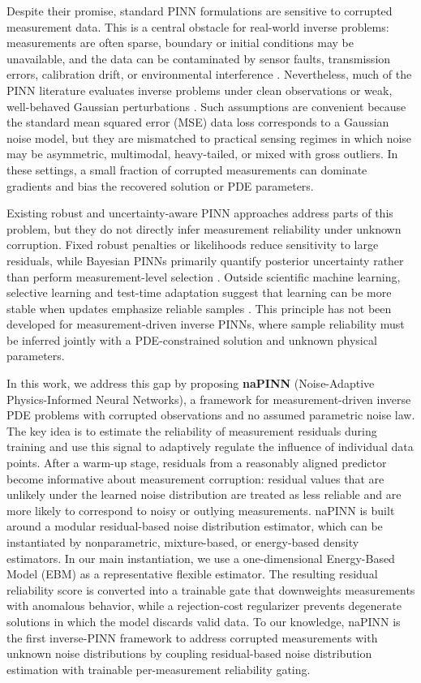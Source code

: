 \documentclass{article}
\theoremstyle{plain}
\theoremstyle{definition}
\theoremstyle{remark}
\begin{document}
Despite their promise, standard PINN formulations are sensitive to corrupted measurement data. This is a central obstacle for real-world inverse problems: measurements are often sparse, boundary or initial conditions may be unavailable, and the data can be contaminated by sensor faults, transmission errors, calibration drift, or environmental interference \cite{Chander2022}. Nevertheless, much of the PINN literature evaluates inverse problems under clean observations or weak, well-behaved Gaussian perturbations \cite{Pilar2024}. Such assumptions are convenient because the standard mean squared error (MSE) data loss corresponds to a Gaussian noise model, but they are mismatched to practical sensing regimes in which noise may be asymmetric, multimodal, heavy-tailed, or mixed with gross outliers. In these settings, a small fraction of corrupted measurements can dominate gradients and bias the recovered solution or PDE parameters.

Existing robust and uncertainty-aware PINN approaches address parts of this problem, but they do not directly infer measurement reliability under unknown corruption. Fixed robust penalties or likelihoods reduce sensitivity to large residuals, while Bayesian PINNs primarily quantify posterior uncertainty rather than perform measurement-level selection \cite{Peng2022, Duarte2025, Yang2021}. Outside scientific machine learning, selective learning and test-time adaptation suggest that learning can be more stable when updates emphasize reliable samples \cite{Yang2024,Wang2024DSS,Kim2024}. This principle has not been developed for measurement-driven inverse PINNs, where sample reliability must be inferred jointly with a PDE-constrained solution and unknown physical parameters.

In this work, we address this gap by proposing \textbf{naPINN} (Noise-Adaptive Physics-Informed Neural Networks), a framework for measurement-driven inverse PDE problems with corrupted observations and no assumed parametric noise law. The key idea is to estimate the reliability of measurement residuals during training and use this signal to adaptively regulate the influence of individual data points. After a warm-up stage, residuals from a reasonably aligned predictor become informative about measurement corruption: residual values that are unlikely under the learned noise distribution are treated as less reliable and are more likely to correspond to noisy or outlying measurements. naPINN is built around a modular residual-based noise distribution estimator, which can be instantiated by nonparametric, mixture-based, or energy-based density estimators. In our main instantiation, we use a one-dimensional Energy-Based Model (EBM) \cite{LeCun2006} as a representative flexible estimator. The resulting residual reliability score is converted into a trainable gate that downweights measurements with anomalous behavior, while a rejection-cost regularizer prevents degenerate solutions in which the model discards valid data. To our knowledge, naPINN is the first inverse-PINN framework to address corrupted measurements with unknown noise distributions by coupling residual-based noise distribution estimation with trainable per-measurement reliability gating.
\end{document}
